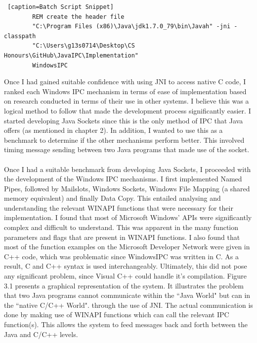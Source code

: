 \documentclass[12pt] {newrucsthesis}    %
\begin{document}
      \begin {lstlisting} [caption=Batch Script Snippet]
        REM create the header file
        "C:\Program Files (x86)\Java\jdk1.7.0_79\bin\Javah" -jni -classpath
        "C:\Users\g13s0714\Desktop\CS Honours\GitHub\JavaIPC\Implementation"
        WindowsIPC
      \end{lstlisting}

      Once I had gained suitable confidence with using JNI to access native C code,
      I ranked each Windows IPC mechanism in terms of ease of implementation based on research conducted
      in terms of their use in other systems. I believe this was a logical method to follow that made the development
      process significantly easier. I started developing Java Sockets since this is the only method of
      IPC that Java offers (as mentioned in chapter 2). In addition, I wanted to
      use this as a benchmark to determine if the other mechanisms perform better.
      This involved timing message sending between two Java programs that made use of
      the socket.
      \\\\
      Once I had a suitable benchmark from developing Java Sockets, I proceeded with the development of
      the Windows IPC mechanisms. I first implemented Named Pipes, followed by Mailslots, Windows Sockets,
      Windows File Mapping (a shared memory equivalent) and finally Data Copy. This entailed analysing and understanding the
      relevant WINAPI functions that were necessary for their implementation. I found that most of Microsoft Windows' APIs were significantly
      complex and difficult to understand. This was apparent in the many function parameters and flags that are present
      in WINAPI functions. I also found that most of the function examples on the Microsoft Developer Network were given in C++ code,
      which was problematic since WindowsIPC was written in C. As a result, C and C++ syntax is used interchangeably. Ultimately, this did not
      pose any significant problem, since Visual C++ could handle it's compilation. Figure 3.1 presents a graphical representation
      of the system. It illustrates the problem that two Java programs cannot communicate within the ``Java World" but can in the ``native C/C++ World".
      through the use of JNI. The actual communication is done by making use of WINAPI functions which can call the relevant IPC function(s). This
      allows the system to feed messages back and forth between the Java and C/C++ levels.
\end{document}
